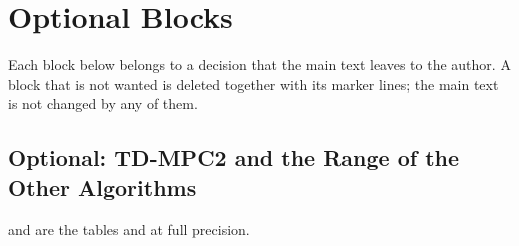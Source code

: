 \section{Optional Blocks}\label{sec:app-full-opt}

Each block below belongs to a decision that the main text leaves to the author.
A block that is not wanted is deleted together with its marker lines; the main text is not changed by any of them.

\subsection{Optional: TD-MPC2 and the Range of the Other Algorithms}\label{sec:app-opt-rob}

 and  are the tables  and  at full precision.

